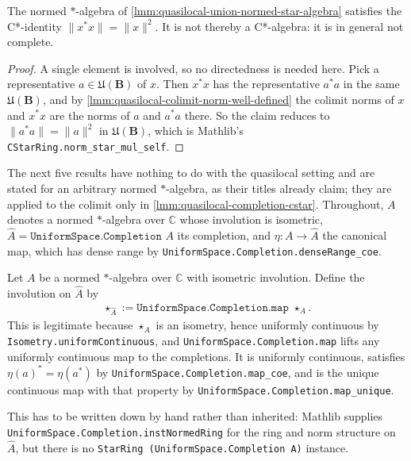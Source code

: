\begin{lemma}
    \label{lmm:quasilocal-colimit-cstar-identity}
    The normed $*$-algebra of \ref{lmm:quasilocal-union-normed-star-algebra} satisfies the C*-identity $\|x^* x\| = \|x\|^2$. It is not thereby a C*-algebra: it is in general not complete.
\end{lemma}
\begin{proof}
    A single element is involved, so no directedness is needed here. Pick a representative $a \in \mathfrak{U}(\mathbf{B})$ of $x$. Then $x^*x$ has the representative $a^*a$ in the same $\mathfrak{U}(\mathbf{B})$, and by \ref{lmm:quasilocal-colimit-norm-well-defined} the colimit norms of $x$ and $x^*x$ are the norms of $a$ and $a^*a$ there. So the claim reduces to $\|a^*a\| = \|a\|^2$ in $\mathfrak{U}(\mathbf{B})$, which is Mathlib's \texttt{CStarRing.norm\_star\_mul\_self}.
\end{proof}

The next five results have nothing to do with the quasilocal setting and are stated for an arbitrary normed $*$-algebra, as their titles already claim; they are applied to the colimit only in \ref{lmm:quasilocal-completion-cstar}. Throughout, $A$ denotes a normed $*$-algebra over $\mathbb{C}$ whose involution is isometric, $\widehat{A} = \texttt{UniformSpace.Completion } A$ its completion, and $\eta : A \to \widehat{A}$ the canonical map, which has dense range by \texttt{UniformSpace.Completion.denseRange\_coe}.

\begin{definition}
    \label{def:completion-star}
    Let $A$ be a normed $*$-algebra over $\mathbb{C}$ with isometric involution. Define the involution on $\widehat{A}$ by
    \begin{align}
        \star_{\widehat{A}} := \texttt{UniformSpace.Completion.map } \star_{A}.
    \end{align}
    This is legitimate because $\star_A$ is an isometry, hence uniformly continuous by \texttt{Isometry.uniformContinuous}, and \texttt{UniformSpace.Completion.map} lifts any uniformly continuous map to the completions. It is uniformly continuous, satisfies $\eta(a)^{*} = \eta(a^{*})$ by \texttt{UniformSpace.Completion.map\_coe}, and is the unique continuous map with that property by \texttt{UniformSpace.Completion.map\_unique}.

    This has to be written down by hand rather than inherited: Mathlib supplies \texttt{UniformSpace.Completion.instNormedRing} for the ring and norm structure on $\widehat{A}$, but there is no \texttt{StarRing (UniformSpace.Completion A)} instance.
\end{definition}

